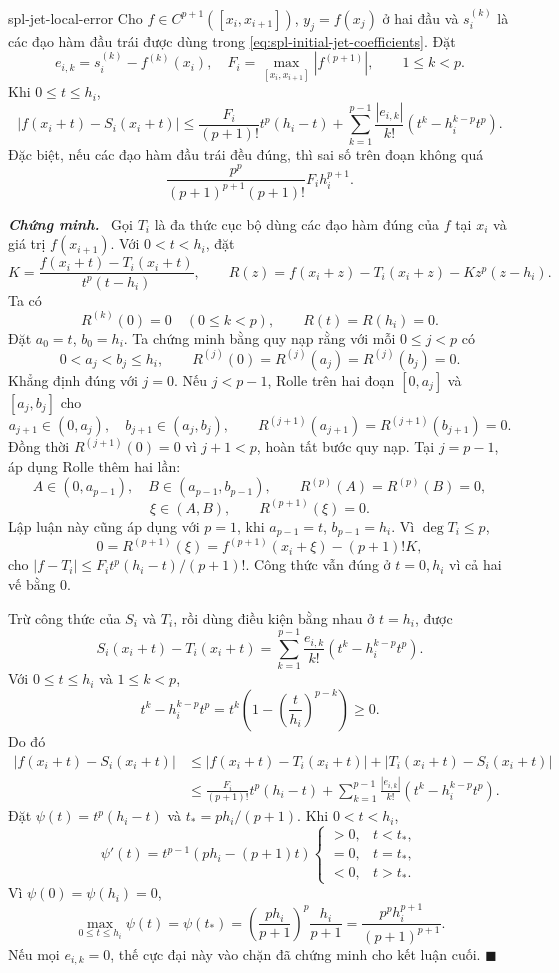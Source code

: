 \documentclass[12pt,a4paper,oneside]{book}
\numberwithin{algorithm}{chapter}
\theoremstyle{definition}
\newenvironment{chungminh}{\par\medskip\noindent\textbf{\textit{\color{mainblue}Chứng minh.}}\ }{\hfill$\blacksquare$\par\medskip}
\begin{document}
\begin{menhde}{}{spl-jet-local-error}
Cho $f\in C^{p+1}([x_i,x_{i+1}])$, $y_j=f(x_j)$ ở hai đầu và $s_i^{(k)}$ là các đạo hàm đầu trái được dùng trong \eqref{eq:spl-initial-jet-coefficients}. Đặt
\[
 e_{i,k}=s_i^{(k)}-f^{(k)}(x_i),\quad
 F_i=\max_{[x_i,x_{i+1}]}|f^{(p+1)}|,\qquad1\leq k<p.
\]
Khi $0\leq t\leq h_i$,
\begin{equation}\label{eq:spl-jet-local-error}
 \left|f(x_i+t)-S_i(x_i+t)\right|
 \leq\frac{F_i}{(p+1)!}t^p(h_i-t)
 +\sum_{k=1}^{p-1}\frac{|e_{i,k}|}{k!}
       \left(t^k-h_i^{k-p}t^p\right).
\end{equation}
Đặc biệt, nếu các đạo hàm đầu trái đều đúng, thì sai số trên đoạn không quá
\[
 \frac{p^p}{(p+1)^{p+1}(p+1)!}F_i h_i^{p+1}.
\]
\end{menhde}
\begin{chungminh}
Gọi $T_i$ là đa thức cục bộ dùng các đạo hàm đúng của $f$ tại $x_i$ và giá trị $f(x_{i+1})$. Với $0<t<h_i$, đặt
\[
 K=\frac{f(x_i+t)-T_i(x_i+t)}{t^p(t-h_i)},\qquad
 R(z)=f(x_i+z)-T_i(x_i+z)-Kz^p(z-h_i).
\]
Ta có
\[
 R^{(k)}(0)=0\quad(0\leq k<p),\qquad R(t)=R(h_i)=0.
\]
Đặt $a_0=t$, $b_0=h_i$. Ta chứng minh bằng quy nạp rằng với mỗi $0\leq j<p$ có
\[
 0<a_j<b_j\leq h_i,\qquad
 R^{(j)}(0)=R^{(j)}(a_j)=R^{(j)}(b_j)=0.
\]
Khẳng định đúng với $j=0$. Nếu $j<p-1$, Rolle trên hai đoạn $[0,a_j]$ và $[a_j,b_j]$ cho
\[
 a_{j+1}\in(0,a_j),\quad b_{j+1}\in(a_j,b_j),\qquad
 R^{(j+1)}(a_{j+1})=R^{(j+1)}(b_{j+1})=0.
\]
Đồng thời $R^{(j+1)}(0)=0$ vì $j+1<p$, hoàn tất bước quy nạp. Tại $j=p-1$, áp dụng Rolle thêm hai lần:
\[
 A\in(0,a_{p-1}),\quad B\in(a_{p-1},b_{p-1}),\qquad
 R^{(p)}(A)=R^{(p)}(B)=0,
\]
\[
 \xi\in(A,B),\qquad R^{(p+1)}(\xi)=0.
\]
Lập luận này cũng áp dụng với $p=1$, khi $a_{p-1}=t$, $b_{p-1}=h_i$. Vì $\deg T_i\leq p$,
\[
 0=R^{(p+1)}(\xi)=f^{(p+1)}(x_i+\xi)-(p+1)!K,
\]
cho $|f-T_i|\leq F_it^p(h_i-t)/(p+1)!$. Công thức vẫn đúng ở $t=0,h_i$ vì cả hai vế bằng $0$.

Trừ công thức của $S_i$ và $T_i$, rồi dùng điều kiện bằng nhau ở $t=h_i$, được
\[
 S_i(x_i+t)-T_i(x_i+t)
 =\sum_{k=1}^{p-1}\frac{e_{i,k}}{k!}
   \left(t^k-h_i^{k-p}t^p\right).
\]
Với $0\leq t\leq h_i$ và $1\leq k<p$,
\[
 t^k-h_i^{k-p}t^p
 =t^k\left(1-\left(\frac{t}{h_i}\right)^{p-k}\right)\geq0.
\]
Do đó
\begin{align*}
 |f(x_i+t)-S_i(x_i+t)|
 &\leq|f(x_i+t)-T_i(x_i+t)|+|T_i(x_i+t)-S_i(x_i+t)|\\
 &\leq\frac{F_i}{(p+1)!}t^p(h_i-t)
 +\sum_{k=1}^{p-1}\frac{|e_{i,k}|}{k!}
   \left(t^k-h_i^{k-p}t^p\right).
\end{align*}
Đặt $\psi(t)=t^p(h_i-t)$ và $t_*=ph_i/(p+1)$. Khi $0<t<h_i$,
\[
 \psi'(t)=t^{p-1}(ph_i-(p+1)t)
 \begin{cases}>0,&t<t_*,\\=0,&t=t_*,\\<0,&t>t_*.\end{cases}
\]
Vì $\psi(0)=\psi(h_i)=0$,
\[
 \max_{0\leq t\leq h_i}\psi(t)
 =\psi(t_*)
 =\left(\frac{ph_i}{p+1}\right)^p\frac{h_i}{p+1}
 =\frac{p^ph_i^{p+1}}{(p+1)^{p+1}}.
\]
Nếu mọi $e_{i,k}=0$, thế cực đại này vào chặn đã chứng minh cho kết luận cuối.
\end{chungminh}
\end{document}
